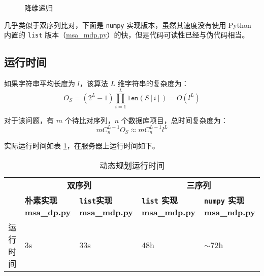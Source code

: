     \begin{figure}[H]
        \centering
        
        \caption{降维递归}\label{fig:downdim}
    \end{figure}


    几乎类似于双序列比对，下面是 \verb"numpy" 实现版本，虽然其速度没有使用 Python 内置的 \verb"list" 版本（\href{./msa\_mdp.py}{\ttfamily msa\_mdp.py}）的快，但是代码可读性已经与伪代码相当。


    \subsection{运行时间}

    如果字符串平均长度为 $l$，该算法 $L$ 维字符串的复杂度为：
    \begin{equation}
        O_S = (2^L-1)\prod_{i=1}^L \texttt{len}(S[i]) = O(l^L)
    \end{equation}

    对于该问题，有 $m$ 个待比对序列，$n$ 个数据库项目，总时间复杂度为：
    \begin{equation*}
        mC_{n}^{L-1}O_S \approx mC_{n}^{L-1}l^L
    \end{equation*}

    实际运行时间如表 \ref{tab:dp}，在服务器上运行时间如下。

    \begin{table}[h]
        \centering
        \caption{动态规划运行时间}\label{tab:dp}
        \begin{tabular}{cb{3cm}b{3cm}b{3cm}b{3cm}}
            \toprule
             &\multicolumn{2}{c}{\bfseries 双序列}  &\multicolumn{2}{c}{\bfseries 三序列} \\
             \cmidrule(r){2-3}\cmidrule(r){4-5} 
             & \bfseries 朴素实现 \href{./msa\_dp.py}{\ttfamily msa\_dp.py} &\bfseries \verb"list"实现 \href{./msa\_mdp.py}{\ttfamily msa\_mdp.py} &\bfseries \verb"list" 实现 \href{./msa\_mdp.py}{\ttfamily msa\_mdp.py} &\bfseries \verb"numpy" 实现 \href{./msa\_ndp.py}{\ttfamily msa\_ndp.py} \\
            \midrule
            运行时间 & 3s & 33s & 48h & $\sim$72h \\
            \bottomrule
        \end{tabular}
    \end{table}

